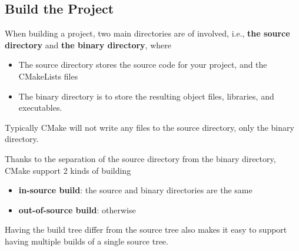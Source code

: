 \subsection{Build the Project}\label{subsec-build-hello-world}
  When building a project, two main directories are of involved, i.e., \textbf{the source directory} and \textbf{the binary directory}, where
  \begin{itemize}  
    \item The source directory stores the source code for your project, and the CMakeLists files
    \item The binary directory is to store the resulting object files, libraries, and executables. 
  \end{itemize}  
  Typically CMake will not write any files to the source directory, only the binary directory.\par
  Thanks to the separation of the source directory from the binary directory, CMake support 2 kinds of building
  \begin{itemize}  
    \item \textbf{in-source build}: the source and binary directories are the same
    \item \textbf{out-of-source build}: otherwise 
  \end{itemize}  
	Having the build tree differ from the source tree also makes it easy to support having multiple builds of a single source tree.
